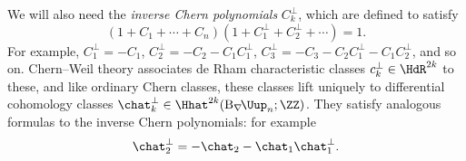 We will also need the \emph{inverse Chern polynomials} $C_k^\perp$, which are defined to satisfy
\begin{equation}
	(1+C_1+\cdots+C_n)(1+C_1^\perp + C_2^\perp + \cdots) = 1.
\end{equation}
For example, $C_1^\perp = -C_1$, $C_2^\perp = -C_2 - C_1C_1^\perp$, $C_3^\perp = -C_3 - C_2C_1^\perp -
C_1C_2^\perp$, and so on. Chern--Weil theory associates de Rham characteristic classes $c_k^\perp\in\HdR^{2k}$ to
these, and like ordinary Chern classes, these classes lift uniquely to differential cohomology classes
$\chat_k^\perp\in \Hhat^{2k}(\mathrm B_\nabla\!\Uup_n;\ZZ)$. They satisfy analogous formulas to the inverse Chern
polynomials: for example
%
\begin{equation}
\label{inverse_Chern_relation}
	\chat_2^\perp = -\chat_2 - \chat_1 \chat_1^\perp.
\end{equation} 



